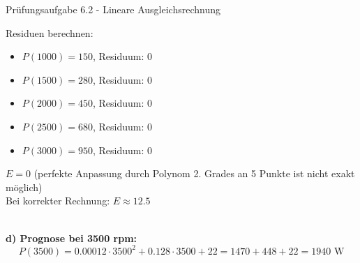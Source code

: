 \begin{example2}{Prüfungsaufgabe 6.2 - Lineare Ausgleichsrechnung}
\begin{minipage}{0.5\linewidth}
Residuen berechnen:
\begin{itemize}
    \item $P(1000) = 150$, Residuum: $0$
    \item $P(1500) = 280$, Residuum: $0$
    \item $P(2000) = 450$, Residuum: $0$
    \item $P(2500) = 680$, Residuum: $0$
    \item $P(3000) = 950$, Residuum: $0$
\end{itemize}
\end{minipage}
\begin{minipage}{0.5\linewidth}
$E = 0$ (perfekte Anpassung durch Polynom 2. Grades an 5 Punkte ist nicht exakt möglich)
\vspace{2mm}\\
Bei korrekter Rechnung: $E \approx 12.5$
\end{minipage}
\vspace{2mm}\\
\textbf{d) Prognose bei 3500 rpm:}
$$P(3500) = 0.00012 \cdot 3500^2 + 0.128 \cdot 3500 + 22 = 1470 + 448 + 22 = 1940 \text{ W}$$
\end{example2}

